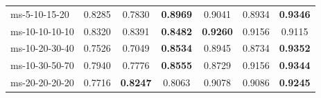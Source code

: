 \begin{table}[!ht]
{\begin{tabular}{lcccccc}
    ms-5-10-15-20                 & 0.8285                           & 0.7830                           & \textbf{0.8969} & 0.9041                           & 0.8934                           & \textbf{0.9346} \\
    ms-10-10-10-10 & 0.8320 & 0.8391 & \textbf{0.8482} & \textbf{0.9260} & 0.9156 & 0.9115 \\
    ms-10-20-30-40                 & 0.7526                           & 0.7049                           & \textbf{0.8534} & 0.8945                           & 0.8734                           & \textbf{0.9352} \\
    ms-10-30-50-70                 & 0.7940                           & 0.7776                           & \textbf{0.8555} & 0.8729                           & 0.9156                           & \textbf{0.9344} \\
    ms-20-20-20-20 & 0.7716 & \textbf{0.8247} & 0.8063 & 0.9078 & 0.9086 & \textbf{0.9245} \\

\end{tabular}}
\end{table}
